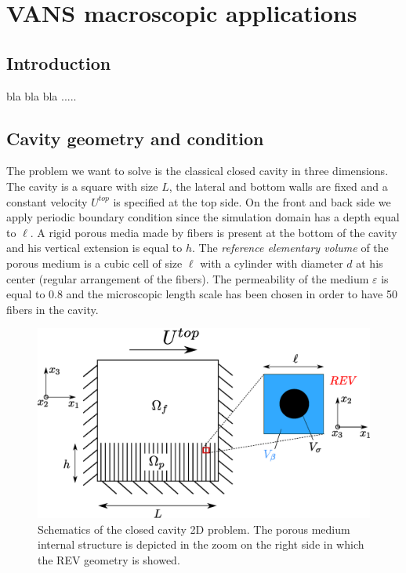 \chapter{VANS macroscopic applications}


\section{Introduction}

bla bla bla .....


\section{Cavity geometry and condition}

The problem we want to solve is the classical closed cavity in three dimensions.
The cavity is a square with size $L$, the lateral and bottom walls are fixed and a constant velocity $U^{top}$ is specified at the top side.
On the front and back side we apply periodic boundary condition since the simulation domain has a depth equal to $\ell$.
A rigid porous media made by fibers is present at the bottom of the cavity and his vertical extension is equal to $h$.
The \textit{reference elementary volume} of the porous medium is a cubic cell of size $\ell$ with a cylinder with diameter $d$ at his center (regular arrangement of the fibers).
The permeability of the medium $\varepsilon$ is equal to 0.8 and the microscopic length scale has been chosen in order to have 50 fibers in the cavity.

\begin{figure}[h]
\centering
\includegraphics[width=0.7\linewidth]{chapter_5/figure/cavity_draw.eps}
\caption{Schematics of the closed cavity 2D problem. The porous medium internal structure is depicted in the zoom on the right side in which the REV geometry is showed.}
\label{fig:geom}
\end{figure}

